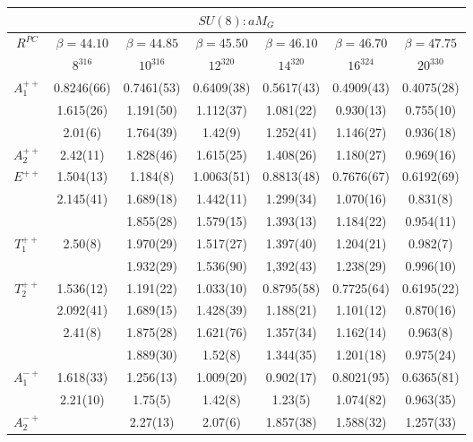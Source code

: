 \documentclass[12pt]{article}
\begin{document}
\begin{table}[htb]
\centering
\begin{tabular}{|c|c|c|c|c|c|c|} \hline
\multicolumn{7}{|c|}{$SU(8):aM_G$} \\ \hline
 $R^{PC}$ & $\beta=44.10$ & $\beta=44.85$ & $\beta=45.50$ & $\beta=46.10$ & $\beta=46.70$  & $\beta=47.75$    \\ 
          & $8^316$ & $10^316$ & $12^320$  & $14^320$ & $16^324$ & $20^330$    \\ \hline \hline
$A^{++}_1$ & 0.8246(66) & 0.7461(53) & 0.6409(38) & 0.5617(43) & 0.4909(43) & 0.4075(28)   \\
          & 1.615(26)  & 1.191(50)  & 1.112(37) & 1.081(22) & 0.930(13) & 0.755(10)   \\
          & 2.01(6)    & 1.764(39)  & 1.42(9)  & 1.252(41) & 1.146(27)  & 0.936(18)   \\ \hline
$A^{++}_2$ & 2.42(11)   & 1.828(46)  & 1.615(25) & 1.408(26) & 1.180(27) & 0.969(16)    \\ \hline
$E^{++}$   & 1.504(13)  & 1.184(8)  & 1.0063(51) & 0.8813(48) & 0.7676(67) & 0.6192(69)   \\
          &  2.145(41) & 1.689(18) & 1.442(11)  & 1.299(34)  & 1.070(16)  & 0.831(8)  \\ 
          &            & 1.855(28) & 1.579(15)  & 1.393(13) & 1.184(22)  &  0.954(11)  \\ \hline
$T^{++}_1$ & 2.50(8)   & 1.970(29)  & 1.517(27)  & 1.397(40) & 1.204(21)  & 0.982(7)   \\
          &           & 1.932(29)  & 1.536(90)  & 1,392(43) & 1.238(29)  & 0.996(10) \\ \hline
$T^{++}_2$ & 1.536(12)  & 1.191(22)  & 1.033(10) & 0.8795(58) & 0.7725(64) & 0.6195(22)   \\
          & 2.092(41)  & 1.689(15)  & 1.428(39) & 1.188(21) & 1.101(12)  & 0.870(16)   \\ 
          & 2.41(8)  & 1.875(28)  & 1.621(76)  & 1.357(34) & 1.162(14)  & 0.963(8)   \\ 
          &         & 1.889(30)  & 1.52(8)  & 1.344(35) & 1.201(18)  & 0.975(24)   \\ \hline
$A^{-+}_1$ & 1.618(33) & 1.256(13)  & 1.009(20)  & 0.902(17) & 0.8021(95) & 0.6365(81)   \\
          & 2.21(10)  & 1.75(5)   & 1.42(8)   & 1.23(5)  & 1.074(82)   &  0.963(35)  \\ \hline
$A^{-+}_2$ &           & 2.27(13)  & 2.07(6)   & 1.857(38) & 1.588(32)  &  1.257(33) \\ \hline

\end{tabular}
\end{table}
\end{document}
